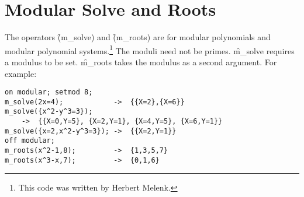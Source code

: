 \section{Modular Solve and Roots}

\hypertarget{operator:M_SOLVE}{}
\hypertarget{operator:M_ROOTS}{}
The operators \f(m\_solve) and \f(m\_roots) are for
modular polynomials and modular polynomial systems.\footnote{This code was written by Herbert Melenk.}  The moduli need not
be primes. \f{m\_solve} requires a modulus to be set.  \f{m\_roots} takes the
modulus as a second argument. For example:

\begin{verbatim}
on modular; setmod 8;
m_solve(2x=4);            ->  {{X=2},{X=6}}
m_solve({x^2-y^3=3});
    ->  {{X=0,Y=5}, {X=2,Y=1}, {X=4,Y=5}, {X=6,Y=1}}
m_solve({x=2,x^2-y^3=3}); ->  {{X=2,Y=1}}
off modular;
m_roots(x^2-1,8);         ->  {1,3,5,7}
m_roots(x^3-x,7);         ->  {0,1,6}
\end{verbatim}
